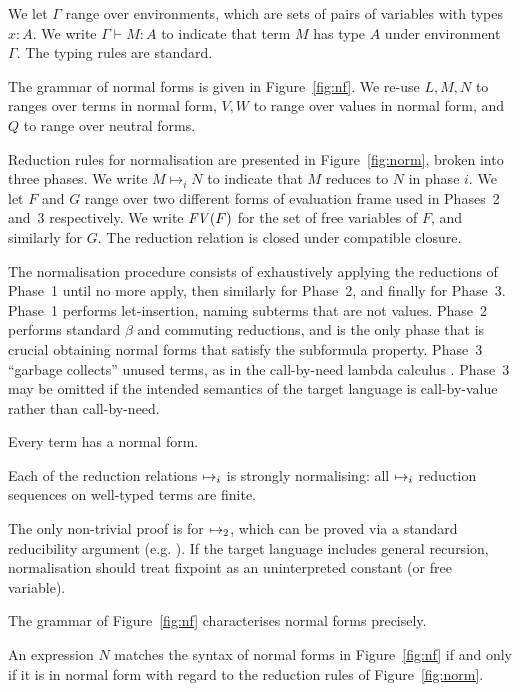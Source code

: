 We let $\Gamma$ range over environments, which are sets of pairs of
variables with types $x:A$. We write $\Gamma \vdash M:A$ to indicate
that term $M$ has type $A$ under environment $\Gamma$. The typing
rules are standard.

The grammar of normal forms is given in Figure~\ref{fig:nf}. We re-use
$L,M,N$ to ranges over terms in normal form, $V,W$ to range over
values in normal form, and $Q$ to range over neutral forms.

Reduction rules for normalisation are presented in
Figure~\ref{fig:norm}, broken into three phases. We write $M
\mapsto_i N$ to indicate that $M$ reduces to $N$ in phase $i$. We let
$F$ and $G$ range over two different forms of evaluation frame used in
Phases~2 and~3 respectively. We write $\text{\textit{FV}}(F)$ for the set of free
variables of $F$, and similarly for $G$.
The reduction relation is closed under compatible closure.

\figterm
\fignf
\fignorm

The normalisation procedure consists of exhaustively applying
the reductions of Phase~1 until no more apply, then similarly for
Phase~2, and finally for Phase~3. Phase~1 performs let-insertion,
naming subterms that are not values.
Phase~2 performs standard $\beta$ and commuting reductions, and is the
only phase that is crucial obtaining normal forms that satisfy the
subformula property. Phase~3 ``garbage collects'' unused terms, as in
the call-by-need lambda calculus \citep{call-by-need}. Phase~3 may be
omitted if the intended semantics of the target language is
call-by-value rather than call-by-need.

Every term has a normal form.
\begin{proposition}
Each of the reduction relations $\mapsto_{i}$ is strongly
normalising: all $\mapsto_{i}$ reduction sequences on well-typed
terms are finite.
\end{proposition}
The only non-trivial proof is for $\mapsto_{2}$, which can be
proved via a standard reducibility argument
(e.g. \cite{Lindley07}). If the target language includes general
recursion, normalisation should treat fixpoint as an uninterpreted
constant (or free variable).

The grammar of Figure~\ref{fig:nf} characterises normal forms
precisely.
\begin{proposition}
\label{prop_normal}
An expression $N$ matches the syntax of normal forms in
Figure~\ref{fig:nf} if and only if it is in normal form with regard to
the reduction rules of Figure~\ref{fig:norm}.
\end{proposition}

